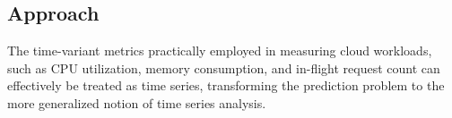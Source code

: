 \subsection{Approach}
The time-variant metrics practically employed in measuring cloud workloads, such as CPU utilization, memory consumption, and in-flight request count can effectively be treated as time series, transforming the prediction problem to the more generalized notion of time series analysis.
